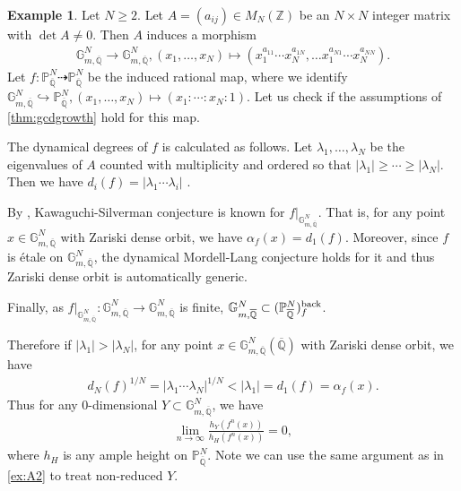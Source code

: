 \documentclass[12pt]{amsart}
\theoremstyle{plain}
\theoremstyle{definition}
\newtheorem{example}[theorem]{Example}
\numberwithin{equation}{section}
\def\Z{{\mathbb Z}}
\def\P{{\mathbb P}}
\def\QQ{\overline{\mathbb Q}}
\renewcommand{\l}{\lambda}
\begin{document}
\begin{example}
Let $N \geq 2$.
Let $A = (a_{ij}) \in M_{N}(\Z)$ be an $N \times N$ integer matrix with $\det A \neq 0$.
Then $A$ induces a morphism 
\begin{align}
{\mathbb{G}}_{m,\QQ}^{N} \longrightarrow {\mathbb{G}}_{m,\QQ}^{N},
(x_{1} ,\dots , x_{N}) \mapsto (x_{1}^{a_{11}} \cdots x_{N}^{a_{1N}}, \dots x_{1}^{a_{N1}} \cdots x_{N}^{a_{NN}}).
\end{align}
Let $f \colon \P^{N}_{\QQ} \dashrightarrow \P^{N}_{\QQ}$
be the induced rational map, where we identify 
${\mathbb{G}}_{m,\QQ}^{N} \hookrightarrow \P^{N}_{\QQ}, (x_{1},\dots, x_{N}) \mapsto (x_{1}:\cdots : x_{N} : 1)$.
Let us check if the assumptions of \cref{thm:gcdgrowth} hold for this map.

The dynamical degrees of $f$ is calculated as follows.
Let $\l_{1}, \dots , \l_{N}$ be the eigenvalues of $A$ counted with multiplicity and ordered so that
$|\l_{1}| \geq \cdots \geq |\l_{N}|$.
Then we have $d_{i}(f) = |\l_{1} \cdots \l_{i}|$ \cite[Theorem 1]{Lin12dyndeg}.

By \cite{Sil12}, Kawaguchi-Silverman conjecture is known for $f|_{ {\mathbb{G}}_{m,\QQ}^{N}}$.
That is, for any point $x \in {\mathbb{G}}_{m, \QQ}^{N}$ with Zariski dense orbit, 
we have $ \alpha_{f}(x) = d_{1}(f)$.
Moreover, since $f$ is \'etale on $ {\mathbb{G}}_{m,\QQ}^{N}$, the dynamical Mordell-Lang conjecture 
holds for it and thus Zariski dense orbit is automatically generic.

Finally, as $f|_{ {\mathbb{G}}_{m,\QQ}^{N}} \colon  {\mathbb{G}}_{m,\QQ}^{N} \longrightarrow  {\mathbb{G}}_{m,\QQ}^{N}$
is finite, ${\mathbb{G}}_{m,\QQ}^{N}  \subset (\P^{N}_{\QQ})_{f}^{\rm back}$.

Therefore if $|\l_{1}| > |\l_{N}|$, for any point $x \in {\mathbb{G}}_{m,\QQ}^{N} (\QQ)$ with Zariski dense orbit,
we have
\begin{align}
d_{N}(f)^{1/N} = |\l_{1} \cdots \l_{N}|^{1/N} < |\l_{1}| = d_{1}(f)  = \alpha_{f}(x).
\end{align}
Thus for any $0$-dimensional $Y \subset {\mathbb{G}}_{m,\QQ}^{N} $, we have
\begin{align}
\lim_{n \to \infty} \frac{h_{Y}(f^{n}(x))}{h_{H}(f^{n}(x))} = 0,
\end{align}
where $h_{H}$ is any ample height on $\P^{N}_{\QQ}$.
Note we can use the same argument as in \cref{ex:A2} to treat non-reduced $Y$.
\end{example}
\end{document}
